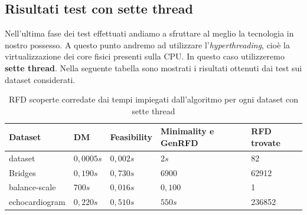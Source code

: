 \subsection{Risultati test con sette thread}
Nell'ultima fase dei test effettuati andiamo a sfruttare al meglio la tecnologia in nostro possesso.
A questo punto andremo ad utilizzare l'\emph{hyperthreading}, cioè la virtualizzazione dei core fisici presenti sulla CPU. In questo caso utilizzeremo \textbf{sette thread}.
Nella seguente tabella sono mostrati i risultati ottenuti dai test sui dataset considerati.
\begin{table}[H]
	\centering
	\begin{tabular}{lllll}
		Dataset & DM & Feasibility & Minimality e GenRFD & RFD trovate \\
		\hline
		dataset& $0,0005s$ & $0,002s$& $2s$  & 82 \\
		Bridges & $0,190s$  & $0,730s$ & $6900$ & 62912 \\
		balance-scale  & $700s$  & $0,016s$ & $0,100$ & 1\\
		echocardiogram  & $0,220s$  & $0,510s$ & $550s$ & 236852\\
		\hline
	\end{tabular}
	\label{risultati_7_thread}
	\caption{RFD scoperte corredate dai tempi impiegati dall'algoritmo per ogni dataset con sette thread}
\end{table}

